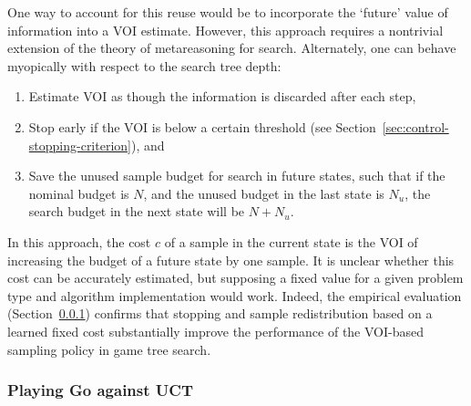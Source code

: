 One way to account for this reuse would be to incorporate the
`future' value of information into a VOI estimate. However, this 
approach requires a nontrivial extension of the theory of metareasoning for search.
Alternately, one can behave myopically with respect to the search tree depth:
\begin{enumerate}
\item Estimate VOI as though the information is discarded after each step,
\item Stop early if the VOI is below a certain threshold
   (see Section~\ref{sec:control-stopping-criterion}), and
\item Save the unused sample budget for search in future states, such that
   if the nominal budget is $N$, and the unused budget in the last state
   is $N_u$, the search budget in the next state will be $N+N_u$.
\end{enumerate}
In this approach, the cost $c$ of a sample in the current state is the
VOI of increasing the budget of a future state by one sample.  It is
unclear whether this cost can be accurately estimated, but supposing
a fixed value for a given problem type and algorithm implementation
would work. Indeed, the empirical evaluation (Section~\ref{sec:emp-go})
confirms that stopping and sample redistribution based on a learned
fixed cost  substantially improve the performance of the VOI-based
sampling policy in game tree search.


\subsubsection{Playing Go against UCT}
\label{sec:emp-go}

